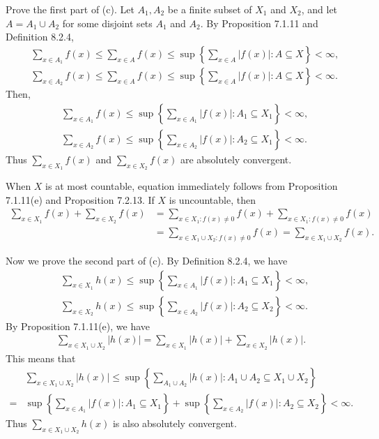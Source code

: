 \documentclass{book}
\begin{document}
\begin{enumerate}
    Prove the first part of (c). Let $A_1,A_2$ be a finite subset of $X_1$ and $X_2$, and let $A=A_1\cup A_2$ for some disjoint sets $A_1$ and $A_2$. By Proposition 7.1.11 and Definition 8.2.4,
        \begin{align*}
            &\sum_{x\in A_1}f(x)\leq\sum_{x\in A}f(x)\leq\sup\left\{\sum_{x\in A}|f(x)|:A\subseteq X\right\}<\infty,\\
            &\sum_{x\in A_2}f(x)\leq\sum_{x\in A}f(x)\leq\sup\left\{\sum_{x\in A}|f(x)|:A\subseteq X\right\}<\infty.
        \end{align*}
    Then,
        \begin{align*}
            &\sum_{x\in A_1}f(x)\leq\sup\left\{\sum_{x\in A_1}|f(x)|:A_1\subseteq X_1\right\}<\infty,\\
            &\sum_{x\in A_2}f(x)\leq\sup\left\{\sum_{x\in A_2}|f(x)|:A_2\subseteq X_1\right\}<\infty.
        \end{align*}
    Thus $\sum_{x\in X_1}f(x)$ and $\sum_{x\in X_2}f(x)$ are absolutely convergent.

    When $X$ is at most countable, equation immediately follows from Proposition 7.1.11(e) and Proposition 7.2.13. If $X$ is uncountable, then
        \begin{align*}
            \sum_{x\in X_1}f(x)+\sum_{x\in X_2}f(x)
            &=\sum_{x\in X_1:f(x)\neq 0}f(x)+\sum_{x\in X_1:f(x)\neq 0}f(x)\\
            &=\sum_{x\in X_1\cup X_2:f(x)\neq 0}f(x)=\sum_{x\in X_1\cup X_2}f(x).
        \end{align*}

    Now we prove the second part of (c). By Definition 8.2.4, we have
        \begin{align*}
            &\sum_{x\in X_1}h(x)\leq\sup\left\{\sum_{x\in A_1}|f(x)|:A_1\subseteq X_1\right\}<\infty,\\
            &\sum_{x\in X_2}h(x)\leq\sup\left\{\sum_{x\in A_2}|f(x)|:A_2\subseteq X_2\right\}<\infty.
        \end{align*}
    By Proposition 7.1.11(e), we have
        \begin{align*}
            \sum_{x\in X_1\cup X_2}|h(x)|=\sum_{x\in X_1}|h(x)|+\sum_{x\in X_2}|h(x)|.
        \end{align*}
    This means that
        \begin{align*}
            &\sum_{x\in X_1\cup X_2}|h(x)|\leq\sup
            \left\{\sum_{A_1\cup A_2}|h(x)|:A_1\cup A_2\subseteq X_1\cup X_2\right\}\\
            =&\sup\left\{\sum_{x\in A_1}|f(x)|:A_1\subseteq X_1\right\}+\sup\left\{\sum_{x\in A_2}|f(x)|:A_2\subseteq X_2\right\}<\infty.
        \end{align*}
    Thus $\sum_{x\in X_1\cup X_2}h(x)$ is also absolutely convergent.
    

\end{enumerate}
\end{document}
